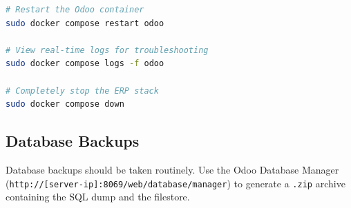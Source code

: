\begin{lstlisting}[language=bash, caption={Basic Docker Commands for ERP Maintenance}]
# Restart the Odoo container
sudo docker compose restart odoo

# View real-time logs for troubleshooting
sudo docker compose logs -f odoo

# Completely stop the ERP stack
sudo docker compose down
\end{lstlisting}

\subsection{Database Backups}
Database backups should be taken routinely. Use the Odoo Database Manager (\texttt{http://[server-ip]:8069/web/database/manager}) to generate a \texttt{.zip} archive containing the SQL dump and the filestore.
